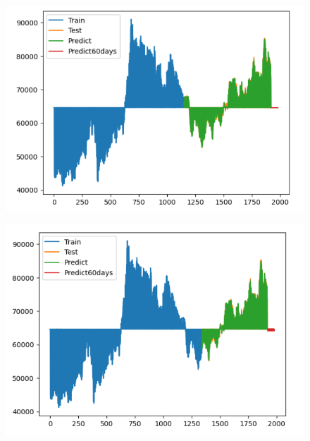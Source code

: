 \documentclass{article}
\begin{document}
\begin{multicols}{2}
\begin{figure}[H]
    \centering
    \begin{minipage}{0.15\textwidth}
    \centering
    \includegraphics[width=1\textwidth]{Image/GradientBoosting/SAMSUNG_60_6_4_GradientBoostingRegressor.png}
   
    \label{fig:1}
    \end{minipage}%
    \begin{minipage}{0.15\textwidth}
    \centering
    \includegraphics[width=1\textwidth]{Image/GradientBoosting/SAMSUNG_60_7_3_GradientBoostingRegressor.png}
  

\end{minipage}
\end{figure}
\end{multicols}
\end{document}

